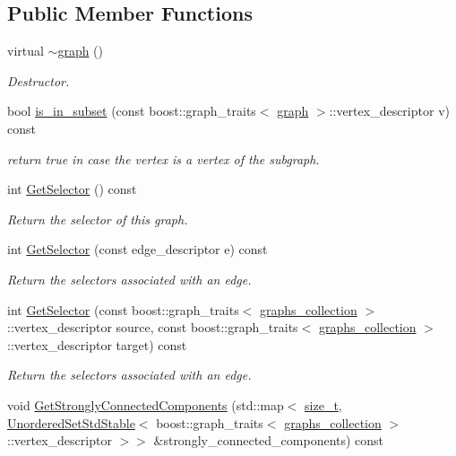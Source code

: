 \subsection*{Public Member Functions}
\begin{DoxyCompactItemize}
\item 
virtual \hyperlink{structgraph_a44d8904cc35fb530b02219df7ac9aa99}{$\sim$graph} ()
\begin{DoxyCompactList}\small\item\em Destructor. \end{DoxyCompactList}\item 
bool \hyperlink{structgraph_aad8bebc31ed6aa323c211485c314d8e8}{is\+\_\+in\+\_\+subset} (const boost\+::graph\+\_\+traits$<$ \hyperlink{structgraph}{graph} $>$\+::vertex\+\_\+descriptor v) const
\begin{DoxyCompactList}\small\item\em return true in case the vertex is a vertex of the subgraph. \end{DoxyCompactList}\item 
int \hyperlink{structgraph_a057f3ce254542cbe465949b1bb9c08c1}{Get\+Selector} () const
\begin{DoxyCompactList}\small\item\em Return the selector of this graph. \end{DoxyCompactList}\item 
int \hyperlink{structgraph_af5ca0d5731ee65e1a05b13baccddd529}{Get\+Selector} (const edge\+\_\+descriptor e) const
\begin{DoxyCompactList}\small\item\em Return the selectors associated with an edge. \end{DoxyCompactList}\item 
int \hyperlink{structgraph_a5e83fae90882209faaf9d5cf78a40a53}{Get\+Selector} (const boost\+::graph\+\_\+traits$<$ \hyperlink{structgraphs__collection}{graphs\+\_\+collection} $>$\+::vertex\+\_\+descriptor source, const boost\+::graph\+\_\+traits$<$ \hyperlink{structgraphs__collection}{graphs\+\_\+collection} $>$\+::vertex\+\_\+descriptor target) const
\begin{DoxyCompactList}\small\item\em Return the selectors associated with an edge. \end{DoxyCompactList}\item 
void \hyperlink{structgraph_a5cf44c94e071e11db6859022de2407ed}{Get\+Strongly\+Connected\+Components} (std\+::map$<$ \hyperlink{tutorial__fpt__2017_2intro_2sixth_2test_8c_a7c94ea6f8948649f8d181ae55911eeaf}{size\+\_\+t}, \hyperlink{custom__set_8hpp_a1f63d303cef2790dc0a0ff7feae38f83}{Unordered\+Set\+Std\+Stable}$<$ boost\+::graph\+\_\+traits$<$ \hyperlink{structgraphs__collection}{graphs\+\_\+collection} $>$\+::vertex\+\_\+descriptor $>$$>$ \&strongly\+\_\+connected\+\_\+components) const
$$
\end{DoxyCompactItemize}
